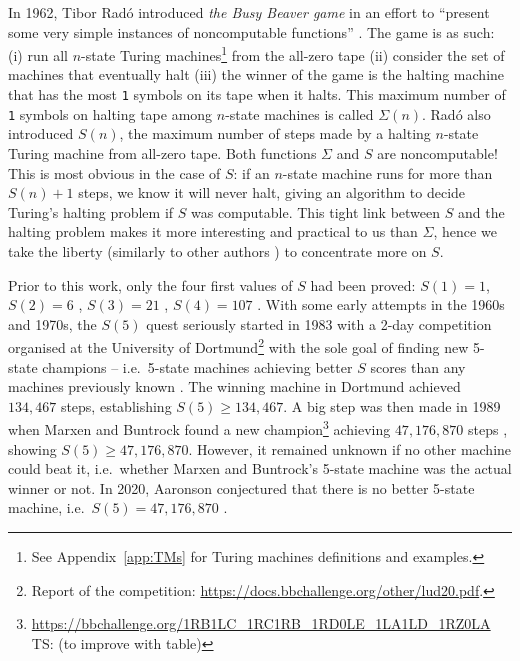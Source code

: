 \documentclass[a4paper,british]{article}
\theoremstyle{definition} %
\numberwithin{equation}{section}
\theoremstyle{definition} %
\newcommand{\ts}[1]{{\color{red}#1}}
\newcommand{\sone}{\texttt{1}\xspace}
\newcommand{\BBtheFifth}{47{,}176{,}870}
\newcommand{\radofull}{Tibor Rad\'o\xspace}
\newcommand{\rado}{Rad\'o\xspace}
\begin{document}
\newcommand{\noncomput}{noncomputable\xspace}
\newcommand{\BBfull}{Busy Beaver\xspace}
\newcommand{\Coq}{Coq\xspace}
\newcommand{\CoqProofReleaseURL}{\url{https://github.com/ccz181078/Coq-BB5}}

\newcommand{\ie}{i.e.~}
\newcommand{\eg}{e.g.~}

In 1962, \radofull introduced \textit{the \BBfull game} in an effort to ``present some very simple instances of \noncomput functions'' \cite{Rado_1962}. The game is as such: (i) run all $n$-state Turing machines\footnote{See Appendix~\ref{app:TMs} for Turing machines definitions and examples.} from the all-zero tape (ii) consider the set of machines that eventually halt (iii) the winner of the game is the halting machine that has the most \sone symbols on its tape when it halts. This maximum number of \sone symbols on halting tape among $n$-state machines is called $\Sigma(n)$. \rado also introduced $S(n)$, the maximum number of steps made by a halting $n$-state Turing machine from all-zero tape. Both functions $\Sigma$ and $S$ are \noncomput! This is most obvious in the case of $S$: if an $n$-state machine runs for more than $S(n)+1$ steps, we know it will never halt, giving an algorithm to decide Turing's halting problem if $S$ was computable. This tight link between $S$ and the halting problem makes it more interesting and practical to us than $\Sigma$, hence we take the liberty (similarly to other authors \cite{BusyBeaverFrontier,otherexamples?}) to concentrate more on $S$.

Prior to this work, only the four first values of $S$ had been proved: $S(1)=1$, $S(2)=6$ \cite{Rado_1962}, $S(3) = 21$ \cite{Lin1963}, $S(4) = 107$ \cite{Brady83}. With some early attempts in the 1960s and 1970s, the $S(5)$ quest seriously started in 1983 with a 2-day competition organised at the University of Dortmund\footnote{Report of the competition: \url{https://docs.bbchallenge.org/other/lud20.pdf}.} with the sole goal of finding new 5-state champions -- \ie 5-state machines achieving better $S$ scores than any machines previously known \cite{PMichel_website,michel2019busy}. The winning machine in Dortmund achieved $134,467$ steps, establishing $S(5) \geq 134,467$. A big step was then made in 1989 when Marxen and Buntrock found a new champion\footnote{\url{https://bbchallenge.org/1RB1LC_1RC1RB_1RD0LE_1LA1LD_1RZ0LA} \ts{TS: (to improve with table)}} achieving $\BBtheFifth$ steps \cite{Marxen_1990}, showing $S(5) \geq \BBtheFifth$. However, it remained unknown if no other machine could beat it, \ie whether Marxen and Buntrock's 5-state machine was the actual winner or not. In 2020, Aaronson conjectured that there is no better 5-state machine, \ie $S(5) = \BBtheFifth$ \cite{BusyBeaverFrontier}.
\end{document}
